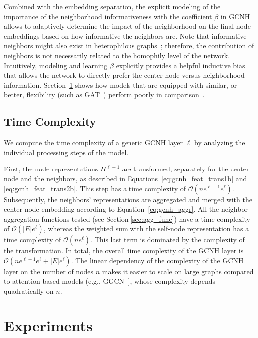 \documentclass[conference]{IEEEtran}
\begin{document}
Combined with the embedding separation, the explicit modeling of the importance of the neighborhood informativeness with the coefficient $\beta$ in GCNH allows to adaptively determine the impact of the neighborhood on the final node embeddings based on how informative the neighbors are.
Note that informative neighbors might also exist in heterophilous graphs~\cite{ma_is_2022, cavallo_2ncs_2022}; therefore, the contribution of neighbors is not necessarily related to the homophily level of the network.
Intuitively, modeling and learning $\beta$ explicitly provides a helpful inductive bias that allows the network to directly prefer the center node versus neighborhood information. Section~\ref{sec:experiments} shows how models that are equipped with similar, or better, flexibility (such as GAT~\cite{velickovic_graph_2018}) perform poorly in comparison~\cite{lim_large_2021}.

\subsection{Time Complexity}\label{sec:complexity}
We compute the time complexity of a generic GCNH layer $\ell$ by analyzing the individual processing steps of the model.

First, the node representations $H^{\ell-1}$ are transformed, separately for the center node and the neighbors, as described in Equations~\eqref{eq:gcnh_feat_trans1b} and \eqref{eq:gcnh_feat_trans2b}. This step has a time complexity of $\mathcal{O}\left(ne^{\ell-1}e^{\ell}\right)$. Subsequently, the neighbors' representations are aggregated and merged with the center-node embedding according to Equation~\eqref{eq:gcnh_aggr}. All the neighbor aggregation functions tested (see Section \ref{sec:agg_func}) have a time complexity of $\mathcal{O}\left(|E|e^{\ell}\right)$, whereas the weighted sum with the self-node representation has a time complexity of $\mathcal{O}\left(ne^{\ell}\right)$. This last term is dominated by the complexity of the transformation. In total, the overall time complexity of the GCNH layer is $\mathcal{O}\left(ne^{\ell-1}e^{\ell} + |E|e^{\ell}\right)$. The linear dependency of the complexity of the GCNH layer on the number of nodes $n$ makes it easier to scale on large graphs compared to attention-based models (e.g., GGCN~\cite{yan_two_2021}), whose complexity depends quadratically on $n$.


\section{Experiments}\label{sec:experiments}
 
\end{document}
